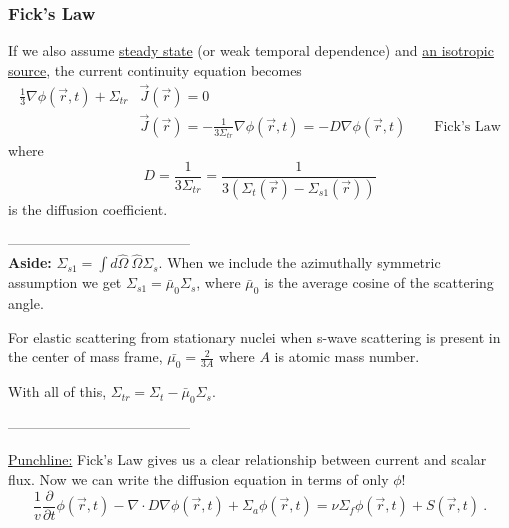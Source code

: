 \documentclass[12pt]{article}
\newlength{\up}
\newcommand{\Macro}{\ensuremath{\Sigma}}
\newcommand{\vOmega}{\ensuremath{\hat{\Omega}}}
\begin{document}
\subsubsection{Fick's Law}
If we also assume \underline{steady state} (or weak temporal dependence) and \underline{an isotropic source}, the current continuity equation becomes
%
\begin{align}
\frac{1}{3} \nabla \phi(\vec{r}, t) +
\Sigma_{tr}  &\vec{J}(\vec{r}) = 0 \\
&\boxed{\vec{J}(\vec{r}) = -\frac{1}{3\Sigma_{tr}} \nabla \phi(\vec{r}, t) = -D\nabla \phi(\vec{r}, t) } \qquad \text{Fick's Law}
\end{align}
%
where
\[D = \frac{1}{3\Macro_{tr}} = \frac{1}{3(\Macro_t(\vec{r}) - \Macro_{s1}(\vec{r}))}\] 
is the diffusion coefficient. 

 ---------------------------------------\\
\textbf{Aside:} $\Macro_{s1}  = \int d\vOmega \:\vOmega \Macro_{s}$. When we include the azimuthally symmetric assumption we get $\Macro_{s1} = \bar{\mu}_{0}\Macro_{s}$, where $\bar{\mu}_{0}$ is the average cosine of the scattering angle.

For elastic scattering from stationary nuclei when s-wave scattering is present in the center of mass frame, $\bar{\mu_{0}} = \frac{2}{3A}$ where $A$ is atomic mass number. 

With all of this, $\Sigma_{tr} = \Sigma_t - \bar{\mu}_0 \Sigma_s$.

%
 ---------------------------------------

\underline{Punchline:} Fick's Law gives us a clear relationship between current and scalar flux. Now we can write the diffusion equation in terms of only $\phi$!
%
\begin{equation}
\boxed{\frac{1}{v}\frac{\partial}{\partial t}\phi(\vec{r}, t) 
-\nabla \cdot D\nabla \phi(\vec{r}, t) + 
\Sigma_a \phi(\vec{r}, t) =
\nu \Sigma_f \phi(\vec{r}, t) +
S(\vec{r}, t)} \:.
\end{equation}
\end{document}
